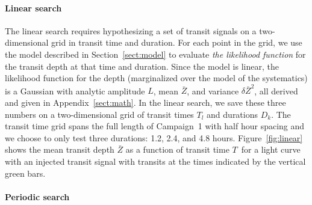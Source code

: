 \documentclass[12pt,preprint]{aastex}
\newcommand{\figref}[1]{\ref{fig:#1}}
\newcommand{\Fig}[1]{Figure~\figref{#1}}
\newcommand{\sectionname}{Section}
\newcommand{\Sect}[1]{\sectionname~\ref{sect:#1}}
\newcommand{\sect}[1]{\Sect{#1}}
\newcommand{\App}[1]{Appendix~\ref{sect:#1}}
\newcommand{\app}[1]{\App{#1}}
\newcommand{\duration}{{\ensuremath{D}}}
\newcommand{\depth}{{\ensuremath{Z}}}
\newcommand{\transittime}{{\ensuremath{T}}}
\begin{document}
\paragraph{Linear search}

The linear search requires hypothesizing a set of transit signals on a
two-dimensional grid in transit time and duration.
For each point in the grid, we use the model described in \sect{model} to
evaluate \emph{the likelihood function} for the transit depth at that time
and duration.
Since the model is linear, the likelihood function for the depth (marginalized
over the model of the systematics) is a Gaussian with analytic amplitude $L$,
mean $\bar{\depth}$, and variance $\delta\bar{\depth}^2$, all derived and given in
\app{math}.
In the linear search, we save these three numbers on a
two-dimensional grid of transit times $\transittime_l$ and durations
$\duration_k$.
The transit time grid spans the full length of Campaign~1 with half hour spacing
and we choose to only test three durations: 1.2, 2.4, and 4.8 hours.
\Fig{linear} shows the mean transit depth $\bar{\depth}$ as a function of
transit time \transittime\ for a light curve with an injected transit signal
with transits at the times indicated by the vertical green bars.



\paragraph{Periodic search}
\end{document}
